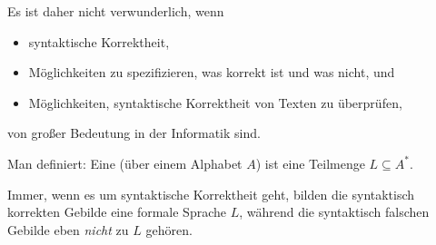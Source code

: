 Es ist daher nicht verwunderlich, wenn
%
\begin{itemize}
\item syntaktische Korrektheit,
\item Möglichkeiten zu spezifizieren, was korrekt ist und was nicht,
  und
\item Möglichkeiten, syntaktische Korrektheit von Texten zu überprüfen,
\end{itemize}
%
von großer Bedeutung in der Informatik sind.

Man definiert: Eine %
 (über einem Alphabet $A$) ist eine
Teilmenge $L\subseteq A^*$.

Immer, wenn es um syntaktische Korrektheit geht, bilden die syntaktisch
korrekten Gebilde eine formale Sprache $L$, während die syntaktisch falschen
Gebilde eben \emph{nicht} zu $L$ gehören.

